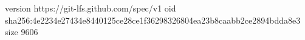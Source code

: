 version https://git-lfs.github.com/spec/v1
oid sha256:4e2234e27434e8440125ce28ce1f36298326804ea23b8caabb2ce2894bdda8e3
size 9606
